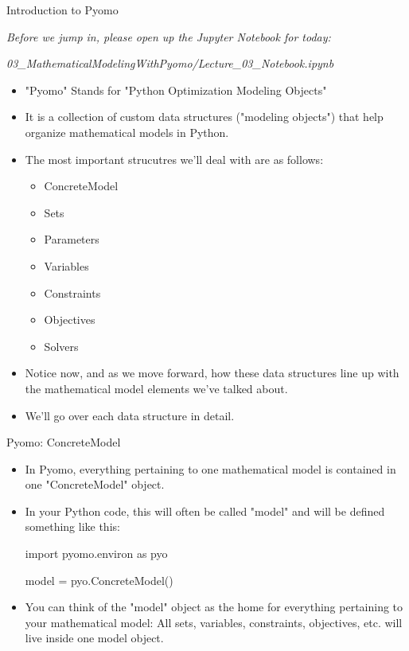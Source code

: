 \documentclass[10pt, aspectratio=169]{beamer}
\begin{document}
\begin{frame}{Introduction to Pyomo}
    \begin{center}
        \textit{Before we jump in, please open up the Jupyter Notebook for today:}
    
        \textit{03\_MathematicalModelingWithPyomo/Lecture\_03\_Notebook.ipynb}
    \end{center}

    \begin{itemize}
        \item "Pyomo" Stands for "Python Optimization Modeling Objects"
        \item It is a collection of custom data structures ("modeling objects") that help organize mathematical models in Python.
        \item The most important strucutres we'll deal with are as follows:
        \begin{itemize}
            \item ConcreteModel
            \item Sets
            \item Parameters
            \item Variables
            \item Constraints
            \item Objectives
            \item Solvers
        \end{itemize}
        \item Notice now, and as we move forward, how these data structures line up with the mathematical model elements we've talked about.
        \item We'll go over each data structure in detail.
    \end{itemize}
\end{frame}

\begin{frame}{Pyomo: ConcreteModel}
    \begin{itemize}
        \item In Pyomo, everything pertaining to one mathematical model is contained in one "ConcreteModel" object.
        \item In your Python code, this will often be called "model" and will be defined something like this:
        
        \hspace{0.25cm} import pyomo.environ as pyo

        \vspace{0.25cm}
        
        \hspace{0.25cm} model = pyo.ConcreteModel()

        \item You can think of the "model" object as the home for everything pertaining to your mathematical model: All sets, variables, constraints, objectives, etc. will live inside one model object.
    \end{itemize}
\end{frame}
\end{document}
